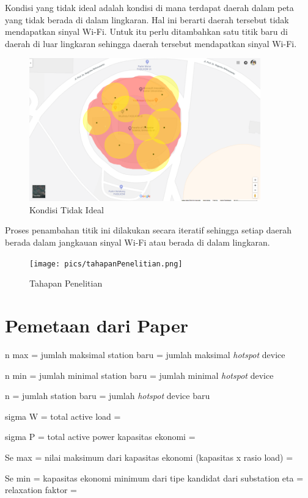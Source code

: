 Kondisi yang tidak ideal adalah kondisi di mana terdapat daerah dalam peta yang tidak berada di dalam lingkaran. Hal ini berarti daerah tersebut tidak mendapatkan sinyal Wi-Fi. Untuk itu perlu ditambahkan satu titik baru di daerah di luar lingkaran sehingga daerah tersebut mendapatkan sinyal Wi-Fi. 

\begin{figure}
	\centering
	\includegraphics[width=10cm]{pics/fasilkom-demand-coverage-minus.png}
	\caption{Kondisi Tidak Ideal}
	\label{fig:kondisiTidakIdeal}
\end{figure}

Proses penambahan titik ini dilakukan secara iteratif sehingga setiap daerah berada dalam jangkauan sinyal Wi-Fi atau berada di dalam lingkaran.

\begin{figure}
	\centering
	\texttt{[image: pics/tahapanPenelitian.png]}
	\caption{Tahapan Penelitian}
	\label{fig:tahapanPenelitian}
\end{figure}

\section{Pemetaan dari Paper}

n max = jumlah maksimal station baru = jumlah maksimal \textit{hotspot} device

n min = jumlah minimal station baru = jumlah minimal \textit{hotspot} device

n = jumlah station baru = jumlah \textit{hotspot} device baru

sigma W = total active load =

sigma P = total active power kapasitas ekonomi = 

Se max = nilai maksimum dari kapasitas ekonomi (kapasitas x rasio load) =

Se min = kapasitas ekonomi minimum dari tipe kandidat dari substation
eta = relaxation faktor = 


